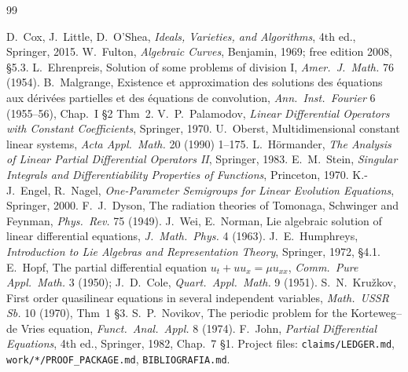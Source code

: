 \begin{thebibliography}{99}\small
{}
 D.~Cox, J.~Little, D.~O'Shea, \emph{Ideals, Varieties, and Algorithms}, 4th ed., Springer, 2015.
 W.~Fulton, \emph{Algebraic Curves}, Benjamin, 1969; free edition 2008, \S5.3.
 L.~Ehrenpreis, Solution of some problems of division I, \emph{Amer.\ J.\ Math.} 76 (1954).
 B.~Malgrange, Existence et approximation des solutions des \'equations aux d\'eriv\'ees partielles et des \'equations de convolution, \emph{Ann.\ Inst.\ Fourier} 6 (1955--56), Chap.~I \S2 Thm~2.
 V.~P.~Palamodov, \emph{Linear Differential Operators with Constant Coefficients}, Springer, 1970.
 U.~Oberst, Multidimensional constant linear systems, \emph{Acta Appl.\ Math.} 20 (1990) 1--175.
 L.~H\"ormander, \emph{The Analysis of Linear Partial Differential Operators II}, Springer, 1983.
 E.~M.~Stein, \emph{Singular Integrals and Differentiability Properties of Functions}, Princeton, 1970.
 K.-J.~Engel, R.~Nagel, \emph{One-Parameter Semigroups for Linear Evolution Equations}, Springer, 2000.
 F.~J.~Dyson, The radiation theories of Tomonaga, Schwinger and Feynman, \emph{Phys.\ Rev.} 75 (1949).
 J.~Wei, E.~Norman, Lie algebraic solution of linear differential equations, \emph{J.\ Math.\ Phys.} 4 (1963).
 J.~E.~Humphreys, \emph{Introduction to Lie Algebras and Representation Theory}, Springer, 1972, \S4.1.
 E.~Hopf, The partial differential equation $u_t+uu_x=\mu u_{xx}$, \emph{Comm.\ Pure Appl.\ Math.} 3 (1950); J.~D.~Cole, \emph{Quart.\ Appl.\ Math.} 9 (1951).
 S.~N.~Kru\v zkov, First order quasilinear equations in several independent variables, \emph{Math.\ USSR Sb.} 10 (1970), Thm~1 \S3.
 S.~P.~Novikov, The periodic problem for the Korteweg--de Vries equation, \emph{Funct.\ Anal.\ Appl.} 8 (1974).
 F.~John, \emph{Partial Differential Equations}, 4th ed., Springer, 1982, Chap.~7 \S1.
 Project files: \texttt{claims/LEDGER.md}, \texttt{work/*/PROOF\_PACKAGE.md}, \texttt{BIBLIOGRAFIA.md}.
\end{thebibliography}
